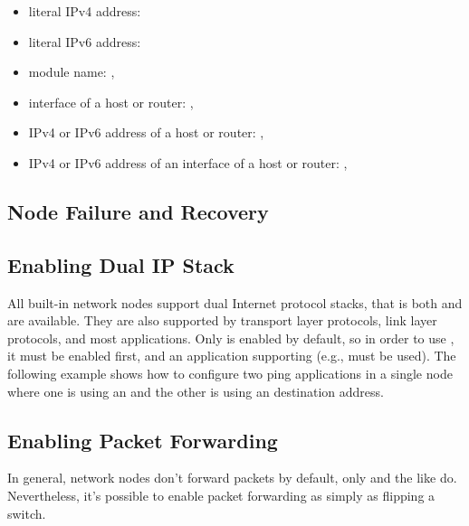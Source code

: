 \begin{itemize}
  \item literal IPv4 address: 
  \item literal IPv6 address: 
  \item module name: , 
  \item interface of a host or router: , 
  \item IPv4 or IPv6 address of a host or router: ,
  \item IPv4 or IPv6 address of an interface of a host or router:
      , 
\end{itemize}

\subsection{Node Failure and Recovery}

\subsection{Enabling Dual IP Stack}

All built-in network nodes support dual Internet protocol stacks, that is
both  and  are available. They are also
supported by transport layer protocols, link layer protocols, and most
applications. Only  is enabled by default, so in order to
use , it must be enabled first, and an application
supporting  (e.g.,  must be used). The
following example shows how to configure two ping applications in a single
node where one is using an  and the other is using an
 destination address.


\subsection{Enabling Packet Forwarding}

In general, network nodes don't forward packets by default, only
 and the like do. Nevertheless, it's possible to enable
packet forwarding as simply as flipping a switch.





